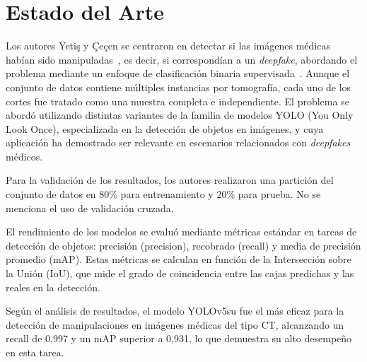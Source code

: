 \documentclass[conference]{IEEEtran}
\begin{document}
\section{Estado del Arte}

Los autores Yetiş y Çeçen se centraron en detectar si las imágenes médicas habían sido manipuladas~\cite{yetis2024}, es decir, si correspondían a un \textit{deepfake}, abordando el problema mediante un enfoque de clasificación binaria supervisada~\cite{yetis2024}. Aunque el conjunto de datos contiene múltiples instancias por tomografía, cada uno de los cortes fue tratado como una muestra completa e independiente. El problema se abordó utilizando distintas variantes de la familia de modelos YOLO (You Only Look Once), especializada en la detección de objetos en imágenes, y cuya aplicación ha demostrado ser relevante en escenarios relacionados con \textit{deepfakes} médicos.

Para la validación de los resultados, los autores realizaron una partición del conjunto de datos en 80\% para entrenamiento y 20\% para prueba. No se menciona el uso de validación cruzada.

El rendimiento de los modelos se evaluó mediante métricas estándar en tareas de detección de objetos: precisión (precision), recobrado (recall) y media de precisión promedio (mAP). Estas métricas se calculan en función de la Intersección sobre la Unión (IoU), que mide el grado de coincidencia entre las cajas predichas y las reales en la detección.

Según el análisis de resultados, el modelo YOLOv5su fue el más eficaz para la detección de manipulaciones en imágenes médicas del tipo CT, alcanzando un recall de 0,997 y un mAP superior a 0,931, lo que demuestra su alto desempeño en esta tarea.



\end{document}
